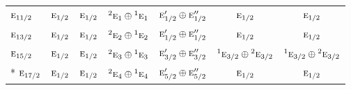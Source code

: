 \documentclass[10pt,a4paper]{article}
\numberwithin{equation}{section}
\newcommand{\irr}[1]{\text{\normalfont\scshape #1}}
\newcommand{\conjpair}[1]{{}^{#1}}
\begin{document}
{\begin{longtable}{@{}lcccccc@{}}
$\irr{e}_{11/2}$ & $\irr{e}_{1/2}$ & $\irr{e}_{1/2}$ & $\conjpair{2}\irr{e}_{1}\oplus \conjpair{1}\irr{e}_{1}$ & $\irr{e}_{1/2}'\oplus \irr{e}_{1/2}''$ & $\irr{e}_{1/2}$ & $\irr{e}_{1/2}$\\
$\irr{e}_{13/2}$ & $\irr{e}_{1/2}$ & $\irr{e}_{1/2}$ & $\conjpair{2}\irr{e}_{2}\oplus \conjpair{1}\irr{e}_{2}$ & $\irr{e}_{1/2}'\oplus \irr{e}_{1/2}''$ & $\irr{e}_{1/2}$ & $\irr{e}_{1/2}$\\
$\irr{e}_{15/2}$ & $\irr{e}_{1/2}$ & $\irr{e}_{1/2}$ & $\conjpair{2}\irr{e}_{3}\oplus \conjpair{1}\irr{e}_{3}$ & $\irr{e}_{3/2}'\oplus \irr{e}_{3/2}''$ & $\conjpair{1}\irr{e}_{3/2}\oplus \conjpair{2}\irr{e}_{3/2}$ & $\conjpair{1}\irr{e}_{3/2}\oplus \conjpair{2}\irr{e}_{3/2}$\\*
$\irr{e}_{17/2}$ & $\irr{e}_{1/2}$ & $\irr{e}_{1/2}$ & $\conjpair{2}\irr{e}_{4}\oplus \conjpair{1}\irr{e}_{4}$ & $\irr{e}_{5/2}'\oplus \irr{e}_{5/2}''$ & $\irr{e}_{1/2}$ & $\irr{e}_{1/2}$\\
\bottomrule\end{longtable}}
\end{document}
